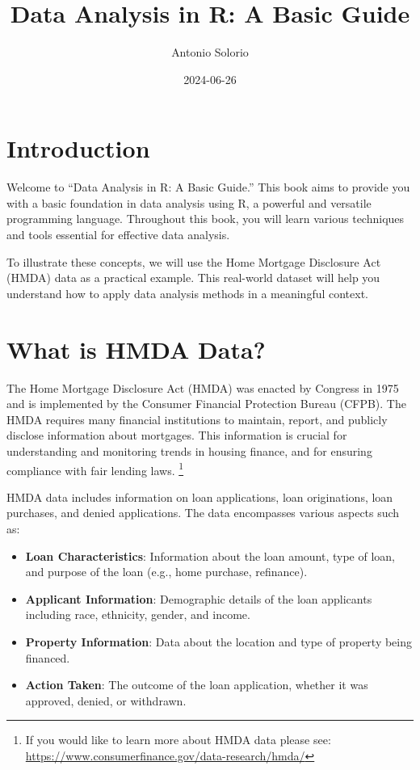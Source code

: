 \documentclass[
]{book}
\title{Data Analysis in R: A Basic Guide}
\author{Antonio Solorio}
\date{2024-06-26}
\providecommand{\tightlist}{%
  \setlength{\itemsep}{0pt}\setlength{\parskip}{0pt}}
\begin{document}
\maketitle

{
\setcounter{tocdepth}{1}
\tableofcontents
}
\hypertarget{introduction}{%
\chapter*{Introduction}\label{introduction}}

Welcome to ``Data Analysis in R: A Basic Guide.'' This book aims to provide you with a basic foundation in data analysis using R, a powerful and versatile programming language. Throughout this book, you will learn various techniques and tools essential for effective data analysis.

To illustrate these concepts, we will use the Home Mortgage Disclosure Act (HMDA) data as a practical example. This real-world dataset will help you understand how to apply data analysis methods in a meaningful context.

\hypertarget{what-is-hmda-data}{%
\chapter{What is HMDA Data?}\label{what-is-hmda-data}}

The Home Mortgage Disclosure Act (HMDA) was enacted by Congress in 1975 and is implemented by the Consumer Financial Protection Bureau (CFPB). The HMDA requires many financial institutions to maintain, report, and publicly disclose information about mortgages. This information is crucial for understanding and monitoring trends in housing finance, and for ensuring compliance with fair lending laws. \footnote{If you would like to learn more about HMDA data please see: \url{https://www.consumerfinance.gov/data-research/hmda/}}

HMDA data includes information on loan applications, loan originations, loan purchases, and denied applications. The data encompasses various aspects such as:

\begin{itemize}
\tightlist
\item
  \textbf{Loan Characteristics}: Information about the loan amount, type of loan, and purpose of the loan (e.g., home purchase, refinance).
\item
  \textbf{Applicant Information}: Demographic details of the loan applicants including race, ethnicity, gender, and income.
\item
  \textbf{Property Information}: Data about the location and type of property being financed.
\item
  \textbf{Action Taken}: The outcome of the loan application, whether it was approved, denied, or withdrawn.
\end{itemize}
\end{document}
